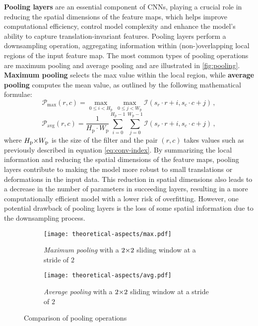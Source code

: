 \textbf{Pooling layers} are an essential component of CNNs, playing a crucial role in reducing the spatial dimensions of the feature maps, which helps improve computational efficiency, control model complexity and enhance the model's ability to capture translation-invariant features. Pooling layers perform a downsampling operation, aggregating information within (non-)overlapping local regions of the input feature map. The most common types of pooling operations are maximum pooling and average pooling and are illustrated in \autoref{fig:pooling}. \textbf{Maximum pooling} selects the max value within the local region, while \textbf{average pooling} computes the mean value, as outlined by the following mathematical formulae:
\begin{equation}
    \mathcal{P}_{\text{max}}(r,c) =
    \max\limits_{0 \le i < H_{\text{p}}} \,
    \max\limits_{0 \le j < W_{\text{p}}}
    \mathcal{I}(s_r \cdot r + i, s_c \cdot c + j) \,,
\end{equation}
\begin{equation}
    \mathcal{P}_{\text{avg}}(r,c) = \dfrac{1}{H_{\text{p}} \cdot W_{\text{p}}}
    \sum\limits_{i=0}^{H_{\text{p}} - 1}
    \sum\limits_{j=0}^{W_{\text{p}} - 1}
    \mathcal{I}(s_r \cdot r + i, s_c \cdot c + j) \,,
\end{equation}
\noindent where $H_{\text{p}} {\times} W_{\text{p}}$ is the size of the filter and the pair $(r, c)$ takes values such as previously described in equation \eqref{eq:conv-index}. By summarizing the local information and reducing the spatial dimensions of the feature maps, pooling layers contribute to making the model more robust to small translations or deformations in the input data. This reduction in spatial dimensions also leads to a decrease in the number of parameters in succeeding layers, resulting in a more computationally efficient model with a lower risk of overfitting. However, one potential drawback of pooling layers is the loss of some spatial information due to the downsampling process.
\begin{figure}[ht]
    \centering
    \captionsetup[subfigure]{justification=centering}
    \begin{subfigure}[b]{0.49\textwidth}
        \centering
        \texttt{[image: theoretical-aspects/max.pdf]}
        \caption{\emph{Maximum pooling} with a $2 {\times} 2$ sliding window at a stride of $2$}
        \label{fig:maxpool}
    \end{subfigure}
    \hspace*{\fill}
    \begin{subfigure}[b]{0.49\textwidth}
        \centering
        \texttt{[image: theoretical-aspects/avg.pdf]}
        \caption{\emph{Average pooling} with a $2 {\times} 2$ sliding window at a stride of $2$}
        \label{fig:avgpool}
    \end{subfigure}
    \caption[Comparison of pooling operations]{Comparison of pooling operations~\supercite{conv-guide}}
    \label{fig:pooling}
\end{figure}

